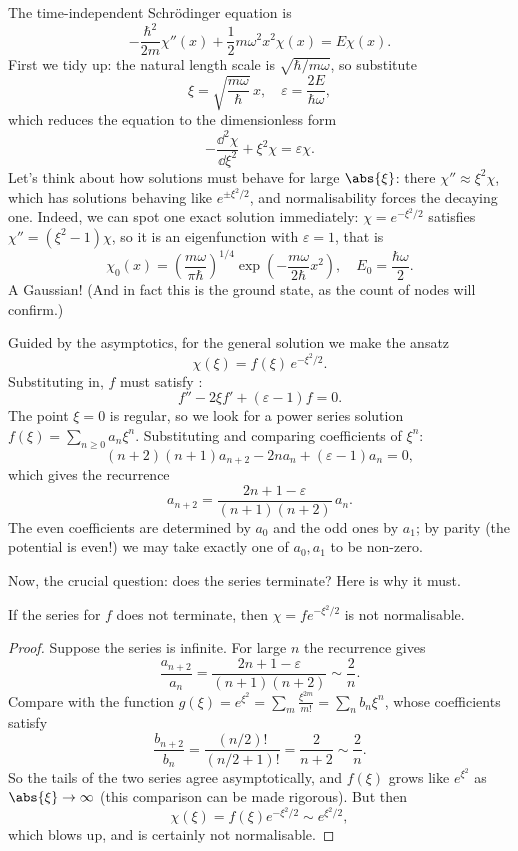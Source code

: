 The time-independent Schr\"odinger equation is
$$
-\frac{\hbar^2}{2m} \chi''(x) + \frac{1}{2} m \omega^2 x^2 \chi(x) = E \chi(x).
$$
First we tidy up: the natural length scale is $\sqrt{\hbar / m\omega}$, so substitute
$$
\xi = \sqrt{\frac{m \omega}{\hbar}} \, x, \quad \varepsilon = \frac{2E}{\hbar \omega},
$$
which reduces the equation to the dimensionless form
$$
-\frac{\dd^2 \chi}{\dd \xi^2} + \xi^2 \chi = \varepsilon \chi.
$$
Let's think about how solutions must behave for large $\abs{\xi}$: there $\chi'' \approx \xi^2 \chi$, which has solutions behaving like $e^{\pm \xi^2/2}$, and normalisability forces the decaying one. Indeed, we can spot one exact solution immediately: $\chi = e^{-\xi^2/2}$ satisfies $\chi'' = (\xi^2 - 1)\chi$, so it is an eigenfunction with $\varepsilon = 1$, that is
$$
\chi_0(x) = \left(\frac{m\omega}{\pi\hbar}\right)^{1/4} \exp\left( -\frac{m \omega}{2 \hbar} x^2 \right), \quad E_0 = \frac{\hbar \omega}{2}.
$$
A Gaussian! (And in fact this is the ground state, as the count of nodes will confirm.)

Guided by the asymptotics, for the general solution we make the ansatz
$$
\chi(\xi) = f(\xi) \, e^{-\xi^2/2}.
$$
Substituting in, $f$ must satisfy :
$$
f'' - 2 \xi f' + (\varepsilon - 1) f = 0.
$$
The point $\xi = 0$ is regular, so we look for a power series solution $f(\xi) = \sum_{n \geq 0} a_n \xi^n$. Substituting and comparing coefficients of $\xi^n$:
$$
(n+2)(n+1) a_{n+2} - 2n a_n + (\varepsilon - 1) a_n = 0,
$$
which gives the recurrence
$$
a_{n+2} = \frac{2n + 1 - \varepsilon}{(n+1)(n+2)} \, a_n.
$$
The even coefficients are determined by $a_0$ and the odd ones by $a_1$; by parity (the potential is even!) we may take exactly one of $a_0, a_1$ to be non-zero.

Now, the crucial question: does the series terminate? Here is why it must.

\begin{proposition}
    If the series for $f$ does not terminate, then $\chi = f e^{-\xi^2/2}$ is not normalisable.
\end{proposition}
\begin{proof}
    Suppose the series is infinite. For large $n$ the recurrence gives
    $$
    \frac{a_{n+2}}{a_n} = \frac{2n + 1 - \varepsilon}{(n+1)(n+2)} \sim \frac{2}{n}.
    $$
    Compare with the function $g(\xi) = e^{\xi^2} = \sum_m \frac{\xi^{2m}}{m!} = \sum_n b_n \xi^n$, whose coefficients satisfy
    $$
    \frac{b_{n+2}}{b_n} = \frac{(n/2)!}{(n/2+1)!} = \frac{2}{n + 2} \sim \frac{2}{n}.
    $$
    So the tails of the two series agree asymptotically, and $f(\xi)$ grows like $e^{\xi^2}$ as $\abs{\xi} \rightarrow \infty$ (this comparison can be made rigorous). But then
    $$
    \chi(\xi) = f(\xi) e^{-\xi^2/2} \sim e^{\xi^2/2},
    $$
    which blows up, and is certainly not normalisable.
\end{proof}

